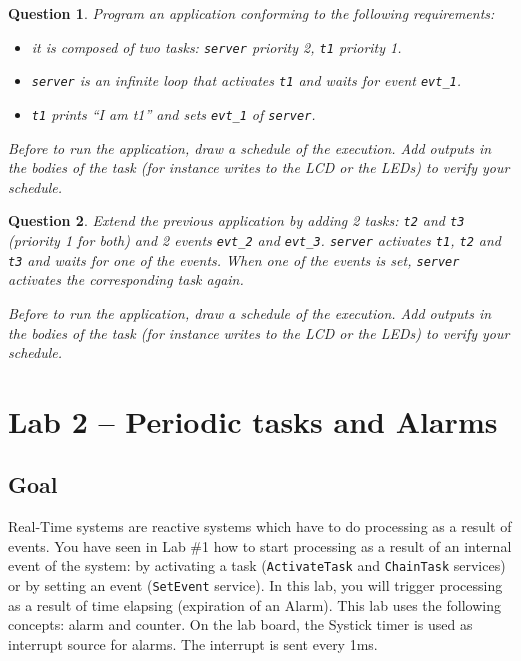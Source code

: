 \documentclass[11pt]{report}
\newtheorem{ex}{Question}
\begin{document}
\begin{ex}
Program an application conforming to the following requirements:

\begin{itemize}
    \item it is composed of two tasks: \texttt{server} priority 2, \texttt{t1} priority 1.
    \item \texttt{server} is an infinite loop that activates \texttt{t1} and waits for event \texttt{evt\_1}.
    \item \texttt{t1} prints ``I am t1'' and sets \texttt{evt\_1} of \texttt{server}.
\end{itemize}

Before to run the application, draw a schedule of the execution. Add outputs in the bodies of the task (for instance writes to the LCD or the LEDs) to verify your schedule.
\end{ex}

\begin{ex}
Extend the previous application by adding 2 tasks: \texttt{t2} and \texttt{t3} (priority 1 for both) and 2 events \texttt{evt\_2} and \texttt{evt\_3}. \texttt{server} activates \texttt{t1}, \texttt{t2} and \texttt{t3} and waits for one of the events. When one of the events is set, \texttt{server} activates the corresponding task again.

Before to run the application, draw a schedule of the execution. Add outputs in the bodies of the task (for instance writes to the LCD or the LEDs) to verify your schedule.
\end{ex}

\chapter{Lab 2 -- Periodic tasks and Alarms}

\section{Goal}

Real-Time systems are reactive systems which have to do processing as a result of events. You have seen in Lab \#1 how to start processing as a result of an internal event of the system: by activating a task (\texttt{ActivateTask} and \texttt{ChainTask} services) or by setting an event (\texttt{SetEvent} service). In this lab, you will trigger processing as a result of time elapsing (expiration of an Alarm). This lab uses the following concepts: alarm and counter. On the lab board, the Systick timer is used as interrupt source for alarms. The interrupt is sent every 1ms.
\end{document}

